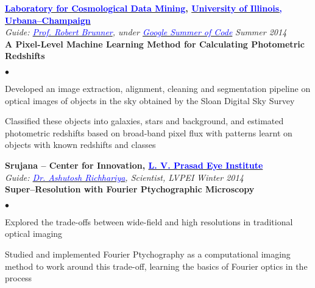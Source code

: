 \documentclass[margin,line]{res}
\newenvironment{list2}{
  \begin{list}{$\bullet$}{%
      \setlength{\itemsep}{0in}
      \setlength{\parsep}{0in} \setlength{\parskip}{0in}
      \setlength{\topsep}{0in} \setlength{\partopsep}{0in} 
      \setlength{\leftmargin}{0.18in}}}{\end{list}}
\begin{document}
\begin{resume}
\vspace*{-0.13in}

{\bf \href{http://lcdm.astro.illinois.edu/}{\textcolor{blue} {Laboratory for Cosmological Data Mining}}, \href{http://www.illinois.edu/}{\textcolor{blue}{University of Illinois, Urbana--Champaign}}} \\
{\em Guide: \href{http://www.astro.illinois.edu/people/bigdog}{\textcolor{blue}{Prof. Robert Brunner}}, under \href{https://www.google-melange.com/gsoc/homepage/google/gsoc2014}{\textcolor{blue} {Google Summer of Code}}} \hfill {\it Summer 2014} \\
\vspace*{-.13in}
\textbf{A Pixel-Level Machine Learning Method for Calculating Photometric Redshifts} \\
\vspace*{-.01in}
\begin{list2}
\item Developed an image extraction, alignment, cleaning and segmentation pipeline on optical images of objects in the sky obtained by the Sloan Digital Sky Survey
\item Classified these objects into galaxies, stars and background, and estimated photometric redshifts based on broad-band pixel flux with patterns learnt on objects with known redshifts and classes
\end{list2}

\vspace*{-0.13in}

{\bf Srujana -- Center for Innovation, \href{http://www.lvpei.org/}{\textcolor{blue}{L. V. Prasad Eye Institute}}} \\
{\em Guide: \href{http://www.lvpei.org/our-team/our-team-ashutosh.php}{\textcolor{blue}{Dr. Ashutosh Richhariya}}, Scientist, LVPEI} \hfill {\it Winter 2014} \\
\vspace*{-.13in}
\textbf{Super--Resolution with Fourier Ptychographic Microscopy} \\
\begin{list2}
\item Explored the trade-offs between wide-field and high resolutions in traditional optical imaging
\item Studied and implemented Fourier Ptychography as a computational imaging method to work around this trade-off, learning the basics of Fourier optics in the process
\end{list2}



\end{resume}
\end{document}
